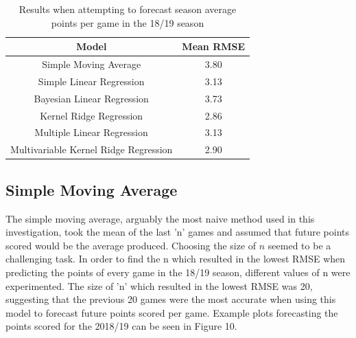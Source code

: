\documentclass[a4paper,11pt,twoside]{article}
\begin{document}
\begin{table}[h!]
\captionsetup{justification=centering}
\begin{center}
\begin{tabular}{ |c|c|} 
 \hline
     \textbf{Model} & \textbf{Mean RMSE}\\ 
 \hline
 Simple Moving Average  & 3.80\\ 
 \hline
 Simple Linear Regression & 3.13\\ 
 \hline
 Bayesian Linear Regression  & 3.73 \\
 \hline
 Kernel Ridge Regression  & 2.86\\
 \hline
 Multiple Linear Regression& 3.13\\
 \hline
 Multivariable Kernel Ridge Regression  & 2.90\\
 \hline
\end{tabular}
\end{center}
\caption{Results when attempting to forecast season average points per game in the 18/19 season}
\end{table}

\subsection{Simple Moving Average}

The simple moving average, arguably the most naive method used in this investigation, took  the mean of the last 'n' games and assumed that future points scored would be the average produced. Choosing the size of $n$ seemed to be a challenging task. In order to find the n which resulted in the lowest RMSE when predicting the points of every game in the 18/19 season, different values of n were experimented. The size of 'n' which resulted in the lowest RMSE was 20, suggesting that the previous 20 games were the most accurate when using this model to forecast future points scored per game. Example plots forecasting the points scored for the 2018/19 can be seen in Figure 10.
\end{document}
